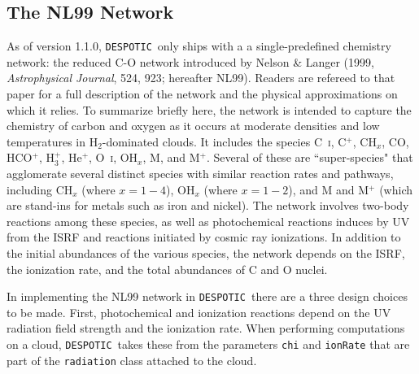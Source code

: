 \documentclass[12pt]{article}
\newcommand{\despotic}{\texttt{DESPOTIC}}
\begin{document}
\subsection{The NL99 Network}

As of version 1.1.0, \despotic\ only ships with a a single-predefined chemistry network: the reduced C-O network introduced by Nelson \& Langer (1999, \textit{Astrophysical Journal}, 524, 923; hereafter NL99). Readers are refereed to that paper for a full description of the network and the physical approximations on which it relies. To summarize briefly here, the network is intended to capture the chemistry of carbon and oxygen as it occurs at moderate densities and low temperatures in H$_2$-dominated clouds. It includes the species C~\textsc{i}, C$^+$, CH$_x$, CO, HCO$^+$, H$_3^+$, He$^+$, O~\textsc{i}, OH$_x$, M, and M$^+$. Several of these are ``super-species" that agglomerate several distinct species with similar reaction rates and pathways, including CH$_x$ (where $x=1-4$), OH$_x$ (where $x=1-2$), and M and M$^+$ (which are stand-ins for metals such as iron and nickel). The network involves two-body reactions among these species, as well as photochemical reactions induces by UV from the ISRF and reactions initiated by cosmic ray ionizations. In addition to the initial abundances of the various species, the network depends on the ISRF, the ionization rate, and the total abundances of C and O nuclei.

In implementing the NL99 network in \despotic\ there are a three design choices to be made. First, photochemical and ionization reactions depend on the UV radiation field strength and the ionization rate. When performing computations on a cloud, \despotic\ takes these from the parameters \verb=chi= and \verb=ionRate= that are part of the \verb=radiation= class attached to the cloud.
\end{document}

